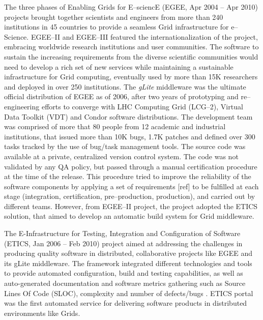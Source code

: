 \documentclass[journal]{IEEEtran}
\begin{document}
The three phases of Enabling Grids for E--sciencE (EGEE, Apr 2004 -- Apr 2010)
\cite{cordis:egee, cordis:egee2, cordis:egee3} projects brought together
scientists and engineers from more than 240 institutions in 45 countries to
provide a seamless Grid infrastructure for e--Science. EGEE--II and EGEE--III
featured the internationalization of the project, embracing worldwide research
institutions and user communities. The software to sustain the increasing
requirements from the diverse scientific communities would need to develop a
rich set of new services while maintaining a sustainable infrastructure for
Grid computing, eventually used by more than 15K researchers and deployed in
over 250 institutions. The {\sl gLite} middleware \cite{glite} was the ultimate
official distribution of EGEE as of 2006, after two years of prototyping and
re--engineering efforts to converge with LHC Computing Grid (LCG--2), Virtual
Data Toolkit (VDT) and Condor \cite{condor} software distributions. The
development team was comprised of more that 80 people from 12 academic and
industrial institutions, that issued more than 10K bugs, 1.7K patches and
defined over 300 tasks tracked by the use of bug/task management tools. The
source code was available at a private, centralized version control system.
The code was not validated by any QA policy, but passed through a manual
certification procedure at the time of the release. This procedure tried to
improve the reliability of the software components by applying a set of
requirements [ref] to be fulfilled at each stage (integration, certification,
pre--production, production), and carried out by different teams. However, from
EGEE--II project, the project adopted the ETICS solution, that aimed to develop
an automatic build system for Grid middleware.

The E-Infrastructure for Testing, Integration and Configuration of Software
\cite{cordis:etics, cordis:etics2} (ETICS, Jan 2006 -- Feb 2010) project aimed
at addressing the challenges in producing quality software in distributed,
collaborative projects like EGEE and its gLite middleware. The framework
integrated different technologies and tools to provide automated configuration,
build and testing capabilities, as well as auto-generated documentation and
software metrics gathering such as Source Lines Of Code (SLOC), complexity and
number of defects/bugs \cite{etics}. ETICS portal was the first automated
service for delivering software products in distributed environments like
Grids.
\end{document}
